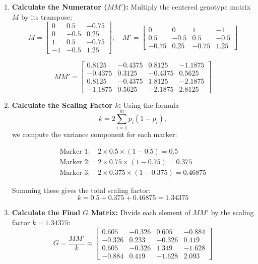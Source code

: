 \documentclass[12pt]{article}
\begin{document}
\begin{enumerate}[label=\alph*)]
    \item \textbf{Calculate the Numerator ($MM'$):}
    Multiply the centered genotype matrix $M$ by its transpose:
    \[
    M =
    \begin{bmatrix}
    0 & 0.5 & -0.75 \\
    0 & -0.5 & 0.25 \\
    1 & 0.5 & -0.75 \\
    -1 & -0.5 & 1.25
    \end{bmatrix}, \quad
    M' =
    \begin{bmatrix}
    0 & 0 & 1 & -1 \\
    0.5 & -0.5 & 0.5 & -0.5 \\
    -0.75 & 0.25 & -0.75 & 1.25
    \end{bmatrix}
    \]

    \[
    MM' =
    \begin{bmatrix}
    0.8125 & -0.4375 & 0.8125 & -1.1875 \\
    -0.4375 & 0.3125 & -0.4375 & 0.5625 \\
    0.8125 & -0.4375 & 1.8125 & -2.1875 \\
    -1.1875 & 0.5625 & -2.1875 & 2.8125
    \end{bmatrix}
    \]

    \item \textbf{Calculate the Scaling Factor $k$:}
    Using the formula
    \[
    k = 2 \sum_{i=1}^{m} p_i(1-p_i),
    \]
    we compute the variance component for each marker:

    \[
    \begin{aligned}
    \text{Marker 1: } & 2 \times 0.5 \times (1 - 0.5) = 0.5 \\
    \text{Marker 2: } & 2 \times 0.75 \times (1 - 0.75) = 0.375 \\
    \text{Marker 3: } & 2 \times 0.375 \times (1 - 0.375) = 0.46875
    \end{aligned}
    \]

    Summing these gives the total scaling factor:
    \[
    k = 0.5 + 0.375 + 0.46875 = 1.34375
    \]

    \item \textbf{Calculate the Final $G$ Matrix:}
    Divide each element of $MM'$ by the scaling factor $k = 1.34375$:
    \[
    G = \frac{MM'}{k} \approx
    \begin{bmatrix}
    0.605 & -0.326 & 0.605 & -0.884 \\
    -0.326 & 0.233 & -0.326 & 0.419 \\
    0.605 & -0.326 & 1.349 & -1.628 \\
    -0.884 & 0.419 & -1.628 & 2.093
    \end{bmatrix}
    \]
\end{enumerate}
\end{document}
